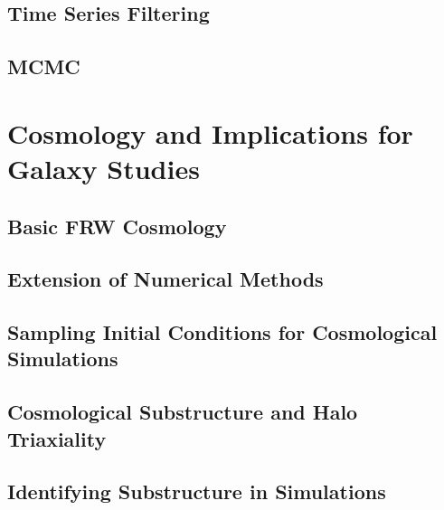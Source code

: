 \subsection{Time Series Filtering}
\subsection{MCMC}

\section{Cosmology and Implications for Galaxy Studies}
\subsection{Basic FRW Cosmology}
\subsection{Extension of Numerical Methods}
\subsection{Sampling Initial Conditions for Cosmological Simulations}
\subsection{Cosmological Substructure and Halo Triaxiality}
\subsection{Identifying Substructure in Simulations}

